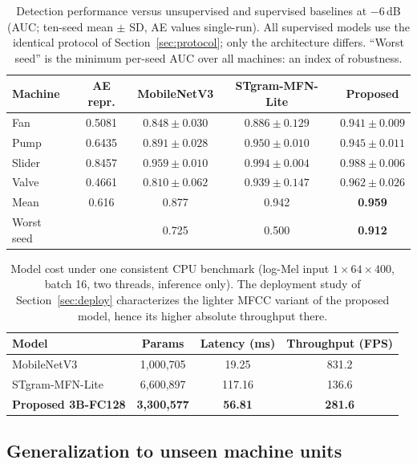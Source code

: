 \documentclass[review,nopreprintline]{elsarticle}
\begin{document}
\begin{table}[t]
\centering
\caption{Detection performance versus unsupervised and supervised baselines at $-6$\,dB (AUC; ten-seed mean $\pm$ SD, AE values single-run). All supervised models use the identical protocol of Section~\ref{sec:protocol}; only the architecture differs. ``Worst seed'' is the minimum per-seed AUC over all machines: an index of robustness.}
\label{tab:ae}
\setlength{\tabcolsep}{3.5pt}
\begin{tabular}{lcccc}
\toprule
Machine & AE repr. & MobileNetV3 & STgram-MFN-Lite & Proposed \\
\midrule
Fan    & 0.5081 & $0.848 \pm 0.030$ & $0.886 \pm 0.129$ & $\mathbf{0.941 \pm 0.009}$ \\
Pump   & 0.6435 & $0.891 \pm 0.028$ & $\mathbf{0.950 \pm 0.010}$ & $0.945 \pm 0.011$ \\
Slider & 0.8457 & $0.959 \pm 0.010$ & $\mathbf{0.994 \pm 0.004}$ & $0.988 \pm 0.006$ \\
Valve  & 0.4661 & $0.810 \pm 0.062$ & $0.939 \pm 0.147$ & $\mathbf{0.962 \pm 0.026}$ \\
\midrule
Mean       & 0.616 & 0.877 & 0.942 & \textbf{0.959} \\
Worst seed &     & 0.725 & 0.500 & \textbf{0.912} \\
\bottomrule
\end{tabular}
\end{table}

\begin{table}[t]
\centering
\caption{Model cost under one consistent CPU benchmark (log-Mel input $1\times64\times400$, batch 16, two threads, inference only). The deployment study of Section~\ref{sec:deploy} characterizes the lighter MFCC variant of the proposed model, hence its higher absolute throughput there.}
\label{tab:complexity}
\begin{tabular}{lccc}
\toprule
Model & Params & Latency (ms) & Throughput (FPS) \\
\midrule
MobileNetV3       & 1{,}000{,}705 & 19.25  & 831.2 \\
STgram-MFN-Lite   & 6{,}600{,}897 & 117.16 & 136.6 \\
\textbf{Proposed 3B-FC128} & \textbf{3{,}300{,}577} & \textbf{56.81} & \textbf{281.6} \\
\bottomrule
\end{tabular}
\end{table}

\subsection{Generalization to unseen machine units}
\label{sec:lomo}
\end{document}
